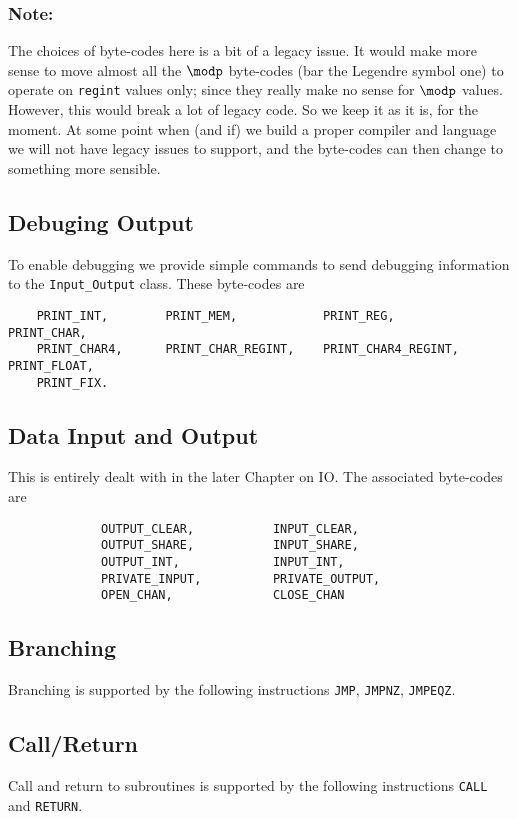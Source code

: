 \subsubsection{Note:}
The choices of byte-codes here is a bit of a legacy issue. It would
make more sense to move almost all the $\modp$ byte-codes (bar the Legendre symbol
one) to operate on \verb|regint| values only; since they really make
no sense for $\modp$ values. However, this would break a lot of legacy code.
So we keep it as it is, for the moment. At some point when (and if) we build a proper
compiler and language we will not have legacy issues to support, and the
byte-codes can then change to something more sensible.

\subsection{Debuging Output}
To enable debugging we provide simple commands to send
debugging information to the \verb+Input_Output+ class.
These byte-codes are
\begin{verbatim}
    PRINT_INT,        PRINT_MEM,            PRINT_REG,              PRINT_CHAR,         
    PRINT_CHAR4,      PRINT_CHAR_REGINT,    PRINT_CHAR4_REGINT,     PRINT_FLOAT,  
    PRINT_FIX.
\end{verbatim}

\subsection{Data Input and Output}
This is entirely dealt with in the later Chapter on IO.
The associated byte-codes are
\begin{verbatim}
             OUTPUT_CLEAR,           INPUT_CLEAR, 
             OUTPUT_SHARE,           INPUT_SHARE, 
             OUTPUT_INT,             INPUT_INT,
             PRIVATE_INPUT,          PRIVATE_OUTPUT,
             OPEN_CHAN,              CLOSE_CHAN
\end{verbatim}

\subsection{Branching}
Branching is supported by the following instructions
 \verb+JMP+,
    \verb+JMPNZ+,
    \verb+JMPEQZ+.

\subsection{Call/Return}
Call and return to subroutines is supported by the following
instructions
\verb+CALL+ and \verb+RETURN+.

